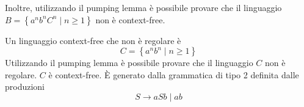 Inoltre, utilizzando il pumping lemma è possibile provare che il linguaggio $B=\left\{a^{n} b^{n} C^{n} \mid n \geq 1\right\}$ non è context-free.


\vspace{5mm}

Un linguaggio context-free che non è regolare è
$$
C=\left\{a^{n} b^{n} \mid n \geq 1\right\}
$$
Utilizzando il pumping lemma è possibile provare che il linguaggio $C$ non è regolare.
$C$ è context-free. È generato dalla grammatica di tipo 2 definita dalle produzioni
$$
S \rightarrow a S b \mid a b
$$




\let\cleardoublepage\clearpage

\begin{comment}

\subsubsection{}

 \xRightarrow[G]{*}
 \underset{r m}{\stackrel{*}{\Rightarrow}}

\begin{figure}[hbpt!]
    \centering
    \texttt{[image: ./Images/7.1.png]}
\end{figure}
\FloatBarrier

\end{comment}
